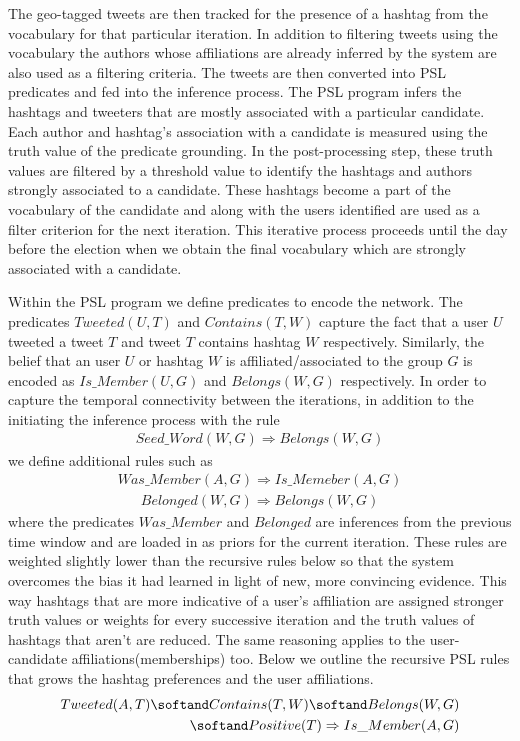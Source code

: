 The geo-tagged tweets are then tracked for the presence of a hashtag from the vocabulary for that particular iteration.
In addition to filtering tweets using the vocabulary the authors whose affiliations are already inferred by the system are also used as a filtering criteria.
The tweets are then converted into PSL predicates and fed into the inference process.
The PSL program infers the hashtags and tweeters that are mostly associated with a particular candidate. 
Each author and hashtag's association with a candidate is measured using the truth value of the predicate grounding.
In the post-processing step, these truth values are filtered by a threshold value to identify the hashtags and authors strongly associated to a candidate.
These hashtags become a part of the vocabulary of the candidate and along with the users identified are used as a filter criterion for the next iteration.
This iterative process proceeds until the day before the election when we obtain the final vocabulary which are strongly associated with a candidate.

Within the PSL program we define predicates to encode the network. 
The predicates $Tweeted(U,T)$ and $Contains(T,W)$  capture the fact that a user $U$ tweeted a tweet $T$ and tweet $T$ contains hashtag $W$ respectively. 
Similarly, the belief that an user $U$ or hashtag $W$ is affiliated/associated to the group $G$ is encoded as $Is\_Member(U,G)$ and $Belongs(W,G)$ respectively.
In order to capture the temporal connectivity between the iterations, in addition to the initiating the inference process with the rule
\begin{align*}
Seed\_Word(W,G) \Rightarrow Belongs(W,G)
\end{align*}
we define additional rules such as
\begin{align*}
Was\_Member(A,G) \Rightarrow Is\_Memeber(A,G)
\end{align*}
\begin{align*}
Belonged(W,G) \Rightarrow Belongs(W,G)
\end{align*}
where the predicates $Was\_Member$ and $Belonged$ are inferences from the previous time window and are loaded in as  priors for the current iteration.
These rules are weighted slightly lower than the recursive rules below so that the system overcomes the bias it had learned in light of new, more convincing evidence.
This way hashtags that are more indicative of a user's affiliation are assigned stronger truth values or weights for every successive iteration and the truth values of hashtags that aren't are reduced.
The same reasoning applies to the user-candidate affiliations(memberships) too.
Below we outline the recursive PSL rules that grows the hashtag preferences and the user affiliations. 
\begin{align*}
\begin{split}
Tweeted(A,T) 
	\softand Contains(T,W)
	\softand Belongs(W,G) \\ 
	\softand Positive(T)
	\Rightarrow Is\_Member(A,G)
\end{split}
\end{align*}

